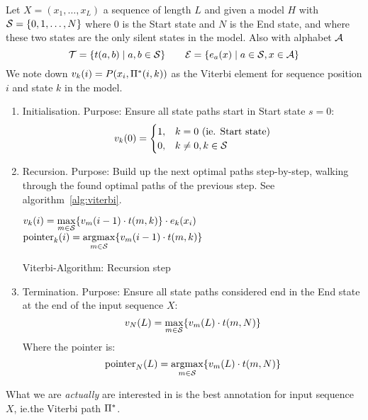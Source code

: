 \begin{definition}
Let \(X=(x_1,\dotsc,x_L)\) a sequence of length \(L\) and given a model \(H\)
with \(\mathcal{S}=\{0,1,\dotsc,N\}\) where \(0\) is the Start state and \(N\) is
the End state, and where these two states are the only silent states in the
model.  Also with alphabet \(\mathcal{A}\)
\[
    \mathcal{T} = \{ t(a,b) \mid a,b \in \mathcal{S} \} \qquad
    \mathcal{E} = \{ e_a(x) \mid a \in \mathcal{S}, x\in\mathcal{A} \}
\]
We note down \(v_k(i) = P(x_i,\Pi^*(i,k))\) as the Viterbi element for
sequence position \(i\) and state \(k\) in the model.

\begin{enumerate}[label=(\alph*)]
\item Initialisation. Purpose: Ensure all state paths start in Start state
  \(s=0\):
  \[
      v_k(0) = \begin{cases}
          1, & k = 0 \text{ (ie. Start state)} \\
          0, & k \neq 0, k\in\mathcal{S}
      \end{cases}
  \]
\item Recursion.  Purpose: Build up the next optimal paths step-by-step, walking
through the found optimal paths of the previous step.
See algorithm~\ref{alg:viterbi}.



\AlgoDisplayBlockMarkers\SetAlgoNoLine%
\begin{algorithm}[ht]
 {
     {
        $v_k(i) = \max\limits_{m\in\mathcal{S}} \{ v_m(i-1) \cdot t(m,k) \} \cdot e_k(x_i)$\;
        $\text{pointer}_k(i) = \operatorname*{argmax}\limits_{m\in\mathcal{S}} \{ v_m(i-1) \cdot t(m,k) \}$\;
    }
}
\label{alg:viterbi}
\caption{Viterbi-Algorithm: Recursion step}
\end{algorithm}
\item Termination. Purpose: Ensure all state paths considered end in the End
  state at the end of the input sequence \(X\):
  \[
      v_N(L) = \max_{m\in\mathcal{S}} \{ v_m(L) \cdot t(m,N) \}
  \]
  Where the pointer is:
  \[
      \text{pointer}_N(L) = \operatorname*{argmax}_{m\in\mathcal{S}} \{ v_m(L) \cdot t(m,N) \}
  \]
\end{enumerate}
What we are \emph{actually} are interested in is the best annotation for input
sequence \(X\), ie.\@ the Viterbi path \(\Pi^*\).


\end{definition}
